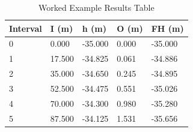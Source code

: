 \documentclass{bcrre_exam}
\begin{document}
\begin{table}[h]
\centering
\caption{Worked Example Results Table}
\label{tab:vc_example}
\begin{tabular}{@{}lllll@{}}
\toprule
Interval & I (m)  & h (m)   & O (m) & FH (m)  \\ \midrule
0        & 0.000  & -35.000 & 0.000 & -35.000 \\
1        & 17.500 & -34.825 & 0.061 & -34.886 \\
2        & 35.000 & -34.650 & 0.245 & -34.895 \\
3        & 52.500 & -34.475 & 0.551 & -35.026 \\
4        & 70.000 & -34.300 & 0.980 & -35.280 \\
5        & 87.500 & -34.125 & 1.531 & -35.656 \\ \bottomrule
\end{tabular}
\end{table}
\end{document}
